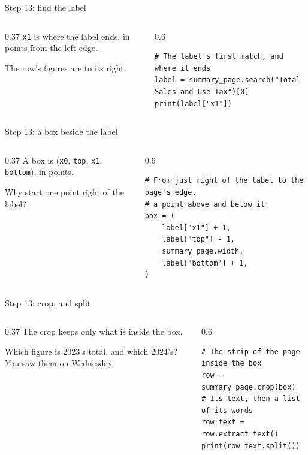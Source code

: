 \documentclass[9pt,aspectratio=169]{beamer}
\begin{document}
\begin{frame}[fragile]{Step 13: find the label}
    \begin{columns}[T]
        \begin{column}{0.37\textwidth}
            \texttt{x1} is where the label ends, in points from the left edge.

            \medskip
            The row's figures are to its right.
        \end{column}
        \begin{column}{0.6\textwidth}
\begin{lstlisting}
# The label's first match, and where it ends
label = summary_page.search("Total Sales and Use Tax")[0]
print(label["x1"])
\end{lstlisting}
        \end{column}
    \end{columns}
\end{frame}

\begin{frame}[fragile]{Step 13: a box beside the label}
    \begin{columns}[T]
        \begin{column}{0.37\textwidth}
            A box is (\texttt{x0}, \texttt{top}, \texttt{x1}, \texttt{bottom}), in points.

            \medskip
            Why start one point right of the label?
        \end{column}
        \begin{column}{0.6\textwidth}
\begin{lstlisting}
# From just right of the label to the page's edge,
# a point above and below it
box = (
    label["x1"] + 1,
    label["top"] - 1,
    summary_page.width,
    label["bottom"] + 1,
)
\end{lstlisting}
        \end{column}
    \end{columns}
\end{frame}

\begin{frame}[fragile]{Step 13: crop, and split}
    \begin{columns}[T]
        \begin{column}{0.37\textwidth}
            The crop keeps only what is inside the box.

            \medskip
            Which figure is 2023's total, and which 2024's? You saw them on Wednesday.
        \end{column}
        \begin{column}{0.6\textwidth}
\begin{lstlisting}
# The strip of the page inside the box
row = summary_page.crop(box)
# Its text, then a list of its words
row_text = row.extract_text()
print(row_text.split())
\end{lstlisting}
        \end{column}
    \end{columns}
\end{frame}
\end{document}
